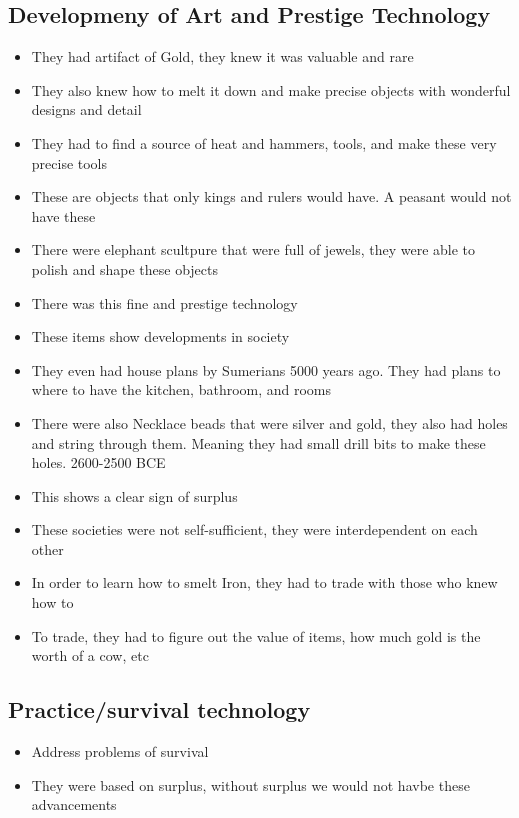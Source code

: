 \documentclass{article}
\begin{document}
\subsection{Developmeny of Art and Prestige Technology}
\begin{itemize}
  \item They had artifact of Gold, they knew
    it was valuable and rare
  \item They also knew how to melt it down and make precise objects with
    wonderful designs and detail
  \item They had to find a source of heat and hammers, tools,
    and make these very precise tools
  \item These are objects that only kings and rulers
    would have. A peasant would not have these
  \item There were elephant scultpure that were full of jewels,
    they were able to polish and shape these objects
  \item There was this fine and prestige technology
  \item These items show developments in society
  \item They even had house plans by Sumerians 5000 years ago.
    They had plans to where to have the kitchen, bathroom, and rooms
  \item There were also Necklace beads that were silver and gold, they also
    had holes and string through them. Meaning they had small drill bits to make
    these holes. 2600-2500 BCE
  \item This shows a clear sign of surplus
  \item These societies were not self-sufficient, they were
    interdependent on each other
  \item In order to learn how to smelt Iron, they had to
    trade with those who knew how to
  \item To trade, they had to figure out the value of items,
    how much gold is the worth of a cow, etc

\end{itemize}

\subsection{Practice/survival technology}
\begin{itemize}
  \item Address problems of survival
  \item They were based on surplus, without surplus we would not havbe these advancements
\end{itemize}
\end{document}
